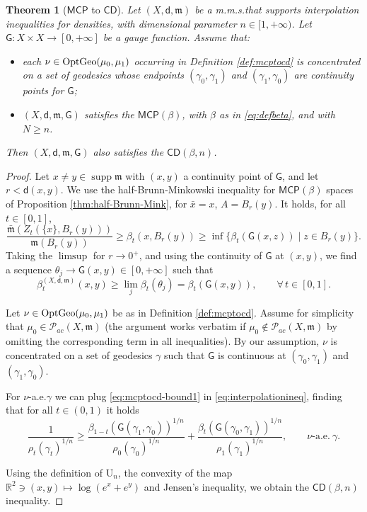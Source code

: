 \documentclass[11pt,a4paper]{article}
\theoremstyle{plain}
\newtheorem{theorem}{Theorem}[section]
\theoremstyle{definition}
\theoremstyle{remark}
\numberwithin{equation}{section}
\newcommand{\R}{\mathbb{R}} %
\DeclareMathOperator{\supp}{\mathrm{supp}}
\newcommand{\CD}{\mathsf{CD}}
\newcommand{\MCP}{\mathsf{MCP}}
\newcommand{\OptGeo}{{\rm OptGeo}}
\newcommand{\U}{\mathrm{U}}
\newcommand{\mm}{\mathfrak m}
\newcommand{\sfd}{\mathsf d}
\newcommand{\sfG}{\mathsf G}
\begin{document}
\begin{theorem}[$\MCP$ to $\CD$]\label{thm:mcptocd}
Let $(X,\sfd, \mm)$ be a m.m.s.\@ that supports interpolation inequalities for densities, with dimensional parameter $n\in [1,+\infty)$. Let $\sfG:X\times X \to [0,+\infty]$ be a gauge function. Assume that:
\begin{itemize}
\item  each $\nu\in\OptGeo(\mu_0,\mu_1)$ occurring in Definition \ref{def:mcptocd} is concentrated on a set of geodesics whose endpoints $(\gamma_0,\gamma_1)$ and $(\gamma_1,\gamma_0)$ are continuity points for $\sfG$;
\item $(X,\sfd, \mm,\sfG)$ satisfies the $\MCP(\beta)$, with $\beta$ as in \eqref{eq:defbeta}, and with $N\geq n$.
\end{itemize}
Then $(X,\sfd, \mm,\sfG)$ also satisfies the $\CD(\beta,n)$.
\end{theorem}


\begin{proof}
Let $x\neq y\in \supp \mm$  with $(x,y)$ a continuity point of $\sfG$, and let $r<\sfd(x,y)$.
We use the half-Brunn-Minkowski inequality for $\MCP(\beta)$ spaces of Proposition \ref{thm:half-Brunn-Mink}, for $\bar{x}=x$, $A=B_r(y)$. It holds, for all $t\in [0,1]$,
\begin{equation}
\frac{\bar{\mm}(Z_t(\{x\},B_r(y)))}{\mm(B_r(y))}\geq \beta_t(x,B_r(y)) \geq \inf \{\beta_t(\sfG(x,z))\mid z \in B_r(y)\}.
\end{equation}
Taking the $\limsup$ for $r\to 0^+$, and using the continuity of $\sfG$ at $(x,y)$, we find a sequence $\theta_j\to \sfG(x,y) \in [0,+\infty]$ such that
\begin{equation}\label{eq:mcptocd-bound1}
\beta_t^{(X,\sfd,\mm)}(x,y) \geq \lim_j \beta_t(\theta_j) = \beta_t(\sfG(x,y)), \qquad \forall\, t\in[0,1].
\end{equation}

Let $\nu\in \OptGeo(\mu_0,\mu_1)$ be as in Definition \ref{def:mcptocd}. Assume for simplicity that $\mu_0 \in \mathcal{P}_{ac}(X,\mm)$ (the argument works verbatim if $\mu_0\notin\mathcal{P}_{ac}(X,\mm)$ by omitting the corresponding term in all inequalities). By our assumption, $\nu$ is concentrated on a set of geodesics $\gamma$ such that $\sfG$ is continuous at $(\gamma_0,\gamma_1)$ and $(\gamma_1,\gamma_0)$.

For $\nu$-a.e.\@ $\gamma$ we can plug \eqref{eq:mcptocd-bound1} in \eqref{eq:interpolationineq}, finding that for all $t\in (0,1)$ it holds
\begin{equation}
\frac{1}{\rho_t(\gamma_t)^{1/n}}\geq \frac{\beta_{1-t}(\sfG(\gamma_1,\gamma_0))^{1/n}}{\rho_0(\gamma_0)^{1/n}} + \frac{\beta_t(\sfG(\gamma_0,\gamma_1))^{1/n}}{\rho_1(\gamma_1)^{1/n}},\qquad \nu\text{-a.e.}\ \gamma.
\end{equation}

Using the definition of $\U_n$,  the convexity of the map $\R^{2}\ni(x,y)\mapsto \log(e^{x}+e^{y})$ and Jensen's inequality, we obtain the $\CD(\beta,n)$ inequality.
\end{proof}
\end{document}
